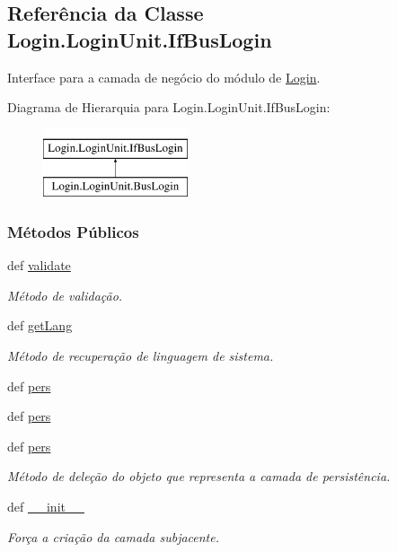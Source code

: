 \hypertarget{classLogin_1_1LoginUnit_1_1IfBusLogin}{\subsection{Referência da Classe Login.\-Login\-Unit.\-If\-Bus\-Login}
\label{classLogin_1_1LoginUnit_1_1IfBusLogin}
}


Interface para a camada de negócio do módulo de \hyperlink{namespaceLogin}{Login}.  


Diagrama de Hierarquia para Login.\-Login\-Unit.\-If\-Bus\-Login\-:\begin{figure}[H]
\begin{center}
\leavevmode
\includegraphics[height=2.000000cm]{dc/dd6/classLogin_1_1LoginUnit_1_1IfBusLogin}
\end{center}
\end{figure}
\subsubsection*{Métodos Públicos}
\begin{DoxyCompactItemize}
\item 
def \hyperlink{classLogin_1_1LoginUnit_1_1IfBusLogin_a55078e3d16b3e0557b557aed92fd7c36}{validate}
\begin{DoxyCompactList}\small\item\em Método de validação. \end{DoxyCompactList}\item 
def \hyperlink{classLogin_1_1LoginUnit_1_1IfBusLogin_a66e981f9d6fc6251de59568c1de028aa}{get\-Lang}
\begin{DoxyCompactList}\small\item\em Método de recuperação de linguagem de sistema. \end{DoxyCompactList}\item 
def \hyperlink{classLogin_1_1LoginUnit_1_1IfBusLogin_a807b0a5d5bdae58087feb9d810a6538d}{pers}
\item 
def \hyperlink{classLogin_1_1LoginUnit_1_1IfBusLogin_a807b0a5d5bdae58087feb9d810a6538d}{pers}
\item 
def \hyperlink{classLogin_1_1LoginUnit_1_1IfBusLogin_a807b0a5d5bdae58087feb9d810a6538d}{pers}
\begin{DoxyCompactList}\small\item\em Método de deleção do objeto que representa a camada de persistência. \end{DoxyCompactList}\item 
def \hyperlink{classLogin_1_1LoginUnit_1_1IfBusLogin_a974c8e8520b02844836d9c7a8e06379b}{\-\_\-\-\_\-init\-\_\-\-\_\-}
\begin{DoxyCompactList}\small\item\em Força a criação da camada subjacente. \end{DoxyCompactList}\end{DoxyCompactItemize}
